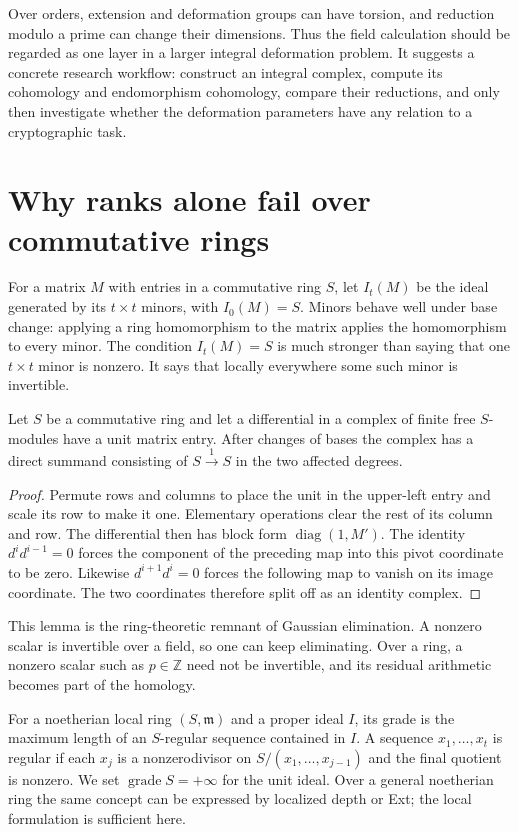 Over orders, extension and deformation groups can have torsion, and reduction modulo a prime can change their dimensions. Thus the field calculation should be regarded as one layer in a larger integral deformation problem. It suggests a concrete research workflow: construct an integral complex, compute its cohomology and endomorphism cohomology, compare their reductions, and only then investigate whether the deformation parameters have any relation to a cryptographic task.

\section{Why ranks alone fail over commutative rings}

For a matrix $M$ with entries in a commutative ring $S$, let $I_t(M)$ be the ideal generated by its $t\times t$ minors, with $I_0(M)=S$. Minors behave well under base change: applying a ring homomorphism to the matrix applies the homomorphism to every minor. The condition $I_t(M)=S$ is much stronger than saying that one $t\times t$ minor is nonzero. It says that locally everywhere some such minor is invertible.

\begin{lemma}
Let $S$ be a commutative ring and let a differential in a complex of finite free $S$-modules have a unit matrix entry. After changes of bases the complex has a direct summand consisting of $S\xrightarrow{1}S$ in the two affected degrees.
\end{lemma}
\begin{proof}
Permute rows and columns to place the unit in the upper-left entry and scale its row to make it one. Elementary operations clear the rest of its column and row. The differential then has block form $\operatorname{diag}(1,M')$. The identity $d^id^{i-1}=0$ forces the component of the preceding map into this pivot coordinate to be zero. Likewise $d^{i+1}d^i=0$ forces the following map to vanish on its image coordinate. The two coordinates therefore split off as an identity complex.
\end{proof}

This lemma is the ring-theoretic remnant of Gaussian elimination. A nonzero scalar is invertible over a field, so one can keep eliminating. Over a ring, a nonzero scalar such as $p\in\mathbb Z$ need not be invertible, and its residual arithmetic becomes part of the homology.

For a noetherian local ring $(S,\mathfrak m)$ and a proper ideal $I$, its grade is the maximum length of an $S$-regular sequence contained in $I$. A sequence $x_1,\dots,x_t$ is regular if each $x_j$ is a nonzerodivisor on $S/(x_1,\dots,x_{j-1})$ and the final quotient is nonzero. We set $\operatorname{grade}S=+\infty$ for the unit ideal. Over a general noetherian ring the same concept can be expressed by localized depth or Ext; the local formulation is sufficient here.

